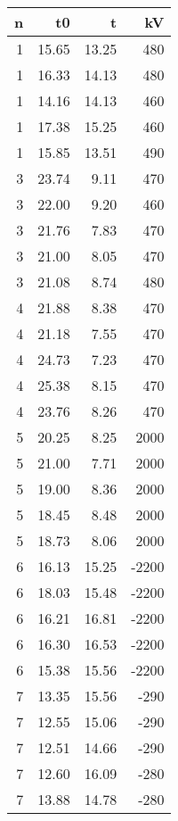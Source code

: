 \begin{tabular}{rrrr}
\toprule
 n &    t0 &     t &    kV \\
\midrule
 1 & 15.65 & 13.25 &   480 \\
 1 & 16.33 & 14.13 &   480 \\
 1 & 14.16 & 14.13 &   460 \\
 1 & 17.38 & 15.25 &   460 \\
 1 & 15.85 & 13.51 &   490 \\
 3 & 23.74 &  9.11 &   470 \\
 3 & 22.00 &  9.20 &   460 \\
 3 & 21.76 &  7.83 &   470 \\
 3 & 21.00 &  8.05 &   470 \\
 3 & 21.08 &  8.74 &   480 \\
 4 & 21.88 &  8.38 &   470 \\
 4 & 21.18 &  7.55 &   470 \\
 4 & 24.73 &  7.23 &   470 \\
 4 & 25.38 &  8.15 &   470 \\
 4 & 23.76 &  8.26 &   470 \\
 5 & 20.25 &  8.25 &  2000 \\
 5 & 21.00 &  7.71 &  2000 \\
 5 & 19.00 &  8.36 &  2000 \\
 5 & 18.45 &  8.48 &  2000 \\
 5 & 18.73 &  8.06 &  2000 \\
 6 & 16.13 & 15.25 & -2200 \\
 6 & 18.03 & 15.48 & -2200 \\
 6 & 16.21 & 16.81 & -2200 \\
 6 & 16.30 & 16.53 & -2200 \\
 6 & 15.38 & 15.56 & -2200 \\
 7 & 13.35 & 15.56 &  -290 \\
 7 & 12.55 & 15.06 &  -290 \\
 7 & 12.51 & 14.66 &  -290 \\
 7 & 12.60 & 16.09 &  -280 \\
 7 & 13.88 & 14.78 &  -280 \\
\bottomrule
\end{tabular}
